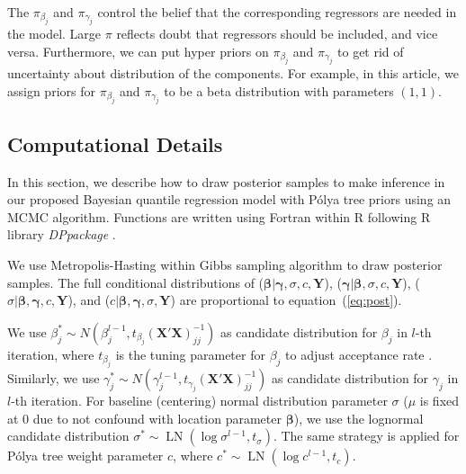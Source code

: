 \documentclass[12pt]{article}
\newcommand{\polya}{P\'{o}lya}
\DeclareMathOperator{\LN}{LN}
\begin{document}
The $\pi_{\beta_j}$ and $\pi_{\gamma_j}$ control the belief that the
corresponding regressors are needed in the model. Large $\pi$ reflects
doubt that regressors should be included, and vice versa. Furthermore,
we can put hyper priors on $\pi_{\beta_j}$ and $\pi_{\gamma_j}$ to get
rid of uncertainty about distribution of the components.  For example,
in this article, we assign priors for $\pi_{\beta_j}$ and
$\pi_{\gamma_j}$ to be a beta distribution with parameters $(1,1)$.

\subsection{Computational Details}\label{sec:computation}

In this section, we describe how to draw posterior samples to make
inference in our proposed Bayesian quantile regression model with
\polya{} tree priors using an MCMC algorithm. Functions are written
using Fortran within R \citep{R} following R library
\textit{DPpackage} \citep{DPpackage}.

We use Metropolis-Hasting within Gibbs sampling algorithm to draw
posterior samples. The full conditional distributions of ($\bm
\beta|\bm \gamma, \sigma, c, \bm Y$), ($\bm \gamma|\bm \beta, \sigma,
c, \bm Y$), ($\sigma|\bm \beta, \bm \gamma, c, \bm Y$), and ($c|\bm
\beta, \bm \gamma, \sigma, \bm Y$) are proportional to
equation~(\ref{eq:post}).

We use $\beta_j^* \sim N(\beta_j^{l-1}, t_{\beta_j}
(\bm{X'X})^{-1}_{jj})$ as candidate distribution for $\beta_j$ in
$l$-th iteration, where $t_{\beta_j}$ is the tuning parameter for
$\beta_j$ to adjust acceptance rate \citep{jara2009}.  Similarly, we
use $\gamma_j^* \sim N(\gamma_j^{l-1},
t_{\gamma_j}(\bm{X'X})^{-1}_{jj})$ as candidate distribution for
$\gamma_j$ in $l$-th iteration.  For baseline (centering) normal
distribution parameter $\sigma$ ($\mu$ is fixed at 0 due to not
confound with location parameter $\bm \beta$), we use the lognormal
candidate distribution $\sigma^* \sim \LN(\log \sigma^{l-1},
t_{\sigma})$. The same strategy is applied for \polya{} tree weight
parameter $c$, where $c^* \sim \LN(\log c^{l-1}, t_c)$.
\end{document}

